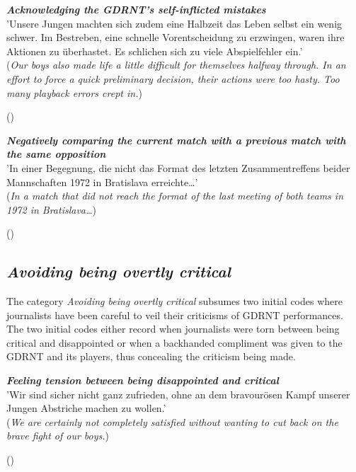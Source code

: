 \begin{displayquote}
\begin{small}
\textbf{\textit{Acknowledging the GDRNT’s self-inflicted mistakes}}\\
'Unsere Jungen machten sich zudem eine Halbzeit das Leben selbst ein wenig schwer. Im Bestreben, eine schnelle Vorentscheidung zu erzwingen, waren ihre Aktionen zu überhastet. Es schlichen sich zu viele Abspielfehler ein.'\\
(\textit{Our boys also made life a little difficult for themselves halfway through. In an effort to force a quick preliminary decision, their actions were too hasty. Too many playback errors crept in.})\
\begin{flushright}\footnotesize (\cite{nd19740615})\end{flushright}
\end{small}
\end{displayquote}

\begin{displayquote}
\begin{small}
\textbf{\textit{Negatively comparing the current match with a previous match with the same opposition}}\\
'In einer Begegnung, die nicht das Format des letzten Zusammentreffens beider Mannschaften 1972 in Bratislava erreichte…'\\
(\textit{In a match that did not reach the format of the last meeting of both teams in 1972 in Bratislava…})\
\begin{flushright}\footnotesize (\cite{nd19740615})\end{flushright}
\end{small}
\end{displayquote}

\subsection*{\textit{Avoiding being overtly critical}}

The category \textit{Avoiding being overtly critical} subsumes two initial codes where journalists have been careful to veil their criticisms of GDRNT performances. The two initial codes either record when journalists were torn between being critical and disappointed or when a backhanded compliment was given to the GDRNT and its players, thus concealing the criticism being made.

\begin{displayquote}
\begin{small}
\textbf{\textit{Feeling tension between being disappointed and critical}}\\
'Wir sind sicher nicht ganz zufrieden, ohne an dem bravourösen Kampf unserer Jungen Abstriche machen zu wollen.'\\
(\textit{We are certainly not completely satisfied without wanting to cut back on the brave fight of our boys.})\
\begin{flushright}\footnotesize (\cite{nd19740619})\end{flushright}
\end{small}
\end{displayquote}

